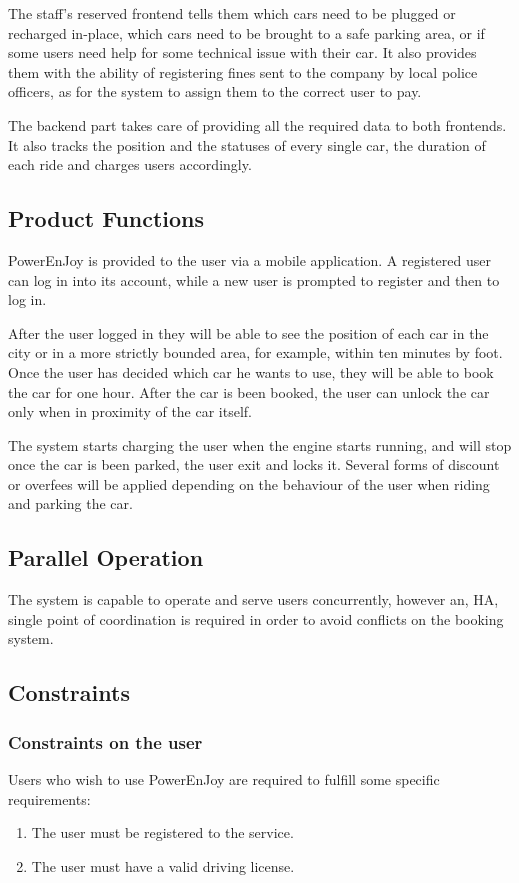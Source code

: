 \documentclass[11pt]{article} %
\newcommand{\pe}{PowerEnJoy }
\begin{document}
The staff's reserved frontend tells them which cars need to be plugged or recharged in-place, which cars need to be brought to a safe parking area, or if some users need help for some technical issue with their car. It also provides them with the ability of registering fines sent to the company by local police officers, as for the system to assign them to the correct user to pay.

  The backend part takes care of providing all the required data to both frontends. It also tracks the position and the statuses of every single car, the duration of each ride and charges users accordingly.
  
\subsection{Product Functions}
  
  \pe is provided to the user via a mobile application. A registered user can log in into its account, while a new user is prompted to register and then to log in.
  
  After the user logged in they will be able to see the position of each car in the city or in a more strictly bounded area, for example, within ten minutes by foot. Once the user has decided which car he wants to use, they will be able to book the car for one hour. After the car is been booked, the user can unlock the car only when in proximity of the car itself.
  
  The system starts charging the user when the engine starts running, and will stop once the car is been parked, the user exit and locks it. Several forms of discount or overfees will be applied depending on the behaviour of the user when riding and parking the car.


\subsection{Parallel Operation}
  The system is capable to operate and serve users concurrently, however an, HA, single point of coordination is required in order to avoid conflicts on the booking system.
 
\subsection{Constraints}
  
	\subsubsection{Constraints on the user}
Users who wish to use \pe are required to fulfill some specific requirements:
\begin{enumerate}
	\item The user must be registered to the service.
	\item The user must have a valid driving license.
\end{enumerate}
\end{document}
